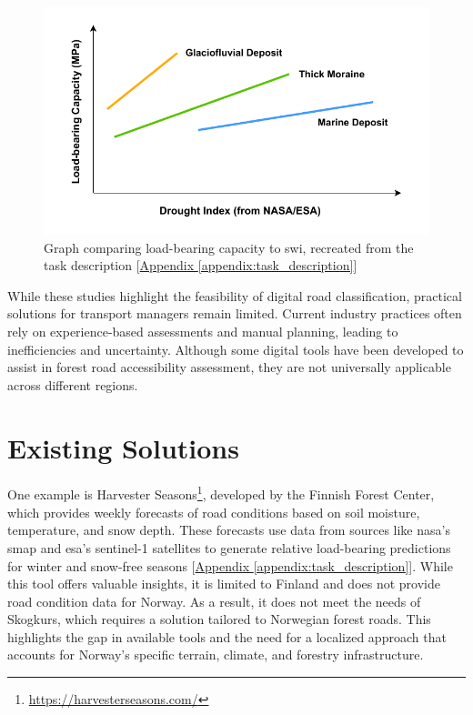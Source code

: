 \begin{figure}[h]
    \centering
    \includegraphics[width=0.7\linewidth]{figures/bæreevne_tørkeindex.pdf}
    \caption[Graph comparing load-bearing capacity to \acrshort{swi}]{Graph comparing load-bearing capacity to \acrshort{swi}, recreated from the task description [\hyperref[appendix:task_description]{Appendix \ref*{appendix:task_description}}]}
    \label{fig:load_to_swi_graph}
\end{figure}

While these studies highlight the feasibility of digital road classification, practical solutions for transport managers remain limited. Current industry practices often rely on experience-based assessments and manual planning, leading to inefficiencies and uncertainty. Although some digital tools have been developed to assist in forest road accessibility assessment, they are not universally applicable across different regions.

\section{Existing Solutions}

One example is Harvester Seasons\footnote{\url{https://harvesterseasons.com/}}, developed by the Finnish Forest Center, which provides weekly forecasts of road conditions based on soil moisture, temperature, and snow depth. These forecasts use data from sources like \acrshort{nasa}'s \gls{smap} and \acrshort{esa}'s \Gls{sentinel-1} satellites to generate relative load-bearing predictions for winter and snow-free seasons [\hyperref[appendix:task_description]{Appendix \ref*{appendix:task_description}}]. While this tool offers valuable insights, it is limited to Finland and does not provide road condition data for Norway. As a result, it does not meet the needs of Skogkurs, which requires a solution tailored to Norwegian forest roads. This highlights the gap in available tools and the need for a localized approach that accounts for Norway’s specific terrain, climate, and forestry infrastructure.

